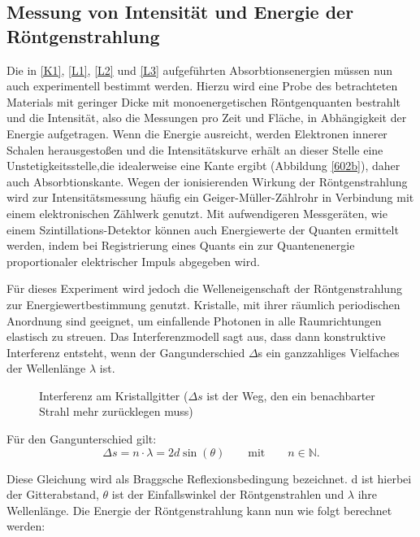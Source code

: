 \subsection{Messung von Intensität und Energie der Röntgenstrahlung}
Die in \eqref{K1},  \eqref{L1},  \eqref{L2}  und \eqref{L3} aufgeführten Absorbtionsenergien müssen nun auch experimentell
bestimmt werden. Hierzu wird eine Probe des betrachteten Materials mit geringer Dicke mit monoenergetischen Röntgenquanten
bestrahlt und die Intensität, also die Messungen pro Zeit und Fläche, in Abhängigkeit der Energie aufgetragen. 
Wenn die Energie ausreicht, werden Elektronen innerer Schalen herausgestoßen und die Intensitätskurve erhält an dieser Stelle 
eine Unstetigkeitsstelle,die idealerweise eine Kante ergibt (Abbildung \eqref{602b}), daher auch Absorbtionskante. Wegen
der ionisierenden Wirkung der Röntgenstrahlung wird zur Intensitätsmessung häufig ein Geiger-Müller-Zählrohr in
Verbindung mit einem elektronischen Zählwerk genutzt. Mit aufwendigeren Messgeräten, wie einem Szintillations-Detektor können
auch Energiewerte der Quanten ermittelt werden, indem bei Registrierung eines Quants ein zur Quantenenergie proportionaler 
elektrischer Impuls abgegeben wird.

Für dieses Experiment wird jedoch die Welleneigenschaft der Röntgenstrahlung zur Energiewertbestimmung genutzt. Kristalle,
mit ihrer räumlich periodischen Anordnung sind geeignet, um einfallende Photonen in alle Raumrichtungen elastisch zu streuen. 
Das Interferenzmodell sagt aus, dass dann konstruktive Interferenz entsteht, wenn der Gangunderschied $\Delta$s ein 
ganzzahliges Vielfaches der Wellenlänge $\lambda$ ist.

\begin{figure}[H]
\centering
\caption{Interferenz am Kristallgitter ($\Delta s$ ist der Weg, den ein benachbarter Strahl mehr zurücklegen muss)}
\label{Gitter}
\end{figure}

Für den Gangunterschied gilt:
\begin{equation}
 \Delta s = n \cdot \lambda = 2d\sin(\theta) \qquad \text{mit} \qquad n \in \mathbb{N}.
\end{equation}

Diese Gleichung wird als Braggsche Reflexionsbedingung bezeichnet. d ist hierbei der Gitterabstand, $\theta$ ist der 
Einfallswinkel der Röntgenstrahlen und $\lambda$ ihre Wellenlänge. Die Energie der Röntgenstrahlung kann nun wie folgt
berechnet werden:

